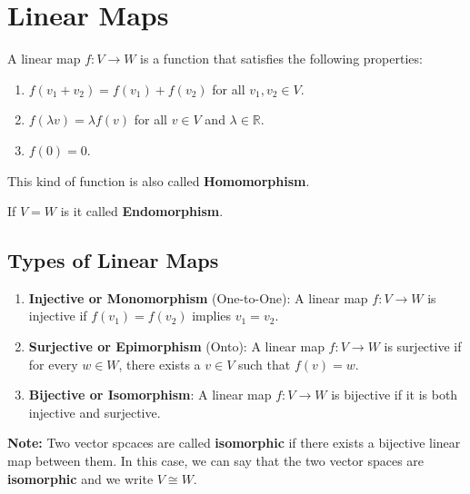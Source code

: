 \section{Linear Maps}
A linear map \( f: V \to W \) is a function that satisfies the following properties:

\begin{enumerate}
    \item \( f(v_1 + v_2) = f(v_1) + f(v_2) \) for all \( v_1, v_2 \in V \).
    \item \( f(\lambda v) = \lambda f(v) \) for all \( v \in V \) and \( \lambda \in \mathbb{R} \).
    \item \( f(0) = 0 \).
\end{enumerate} 

\noindent This kind of function is also called \textbf{Homomorphism}.

\noindent If \(V = W\) is it called \textbf{Endomorphism}.

\subsection{Types of Linear Maps}
\begin{enumerate}
    \item \textbf{Injective or Monomorphism} (One-to-One): A linear map \( f: V \to W \) is injective if \( f(v_1) = f(v_2) \) implies \( v_1 = v_2 \).
    \item \textbf{Surjective or Epimorphism} (Onto): A linear map \( f: V \to W \) is surjective if for every \( w \in W \), there exists a \( v \in V \) such that \( f(v) = w \).
    \item \textbf{Bijective or Isomorphism}: A linear map \( f: V \to W \) is bijective if it is both injective and surjective.
\end{enumerate}

\noindent\textbf{Note:} Two vector spcaces are called 
\textbf{isomorphic} if there exists a bijective linear map between them. In this case, we can say that the two vector spaces are \textbf{isomorphic} and we write \( V \cong W \).

